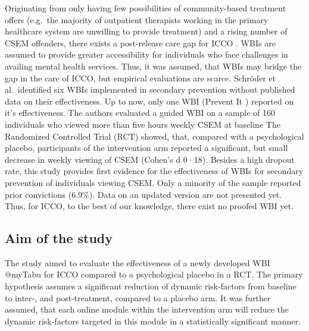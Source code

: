 \documentclass[
  super,
  preprint,
  1p,
  onecolumn]{elsarticle}
\begin{document}
Originating from only having few possibilities of community-based
treatment offers (e.g.~the majority of outpatient therapists working in
the primary healthcare system are unwilling to provide treatment) and a
rising number of CSEM offenders, there exists a post-release care gap
for ICCO .
\citep{schmidtOutpatientTherapistsPerspectives2022, baskurtMetaanalysisRecidivismRates2024}
WBIs are assumed to provide greater accessibility for individuals who
face challenges in availing mental health services.
\citep{crocamoDigitalHealthInterventions2025} Thus, it was assumed, that
WBIs may bridge the gap in the care of ICCO, but empirical evaluations
are scarce.
\citep{wildWebBasedHealthServices2019, hillertWebBasedInitiativesPrevent2024, schroderWebBasedInterventionsIndividuals2023}
Schröder et al.~identified six WBIs implemented in secondary prevention
without published data on their effectiveness.
\citep{schroderWebBasedInterventionsIndividuals2023} Up to now, only one
WBI (Prevent It \citep{latthEffectsInternetdeliveredCognitive2022})
reported on it's effectiveness. The authors evaluated a guided WBI on a
sample of 160 individuals who viewed more than five hours weekly CSEM at
baseline \citep{latthChildSexualAbuse2025} The Randomized Controlled
Trial (RCT) showed, that, compared with a psychological placebo,
participants of the intervention arm reported a significant, but small
decrease in weekly viewing of CSEM (Cohen's d 0·18). Besides a high
dropout rate, this study provides first evidence for the effectiveness
of WBIs for secondary prevention of individuals viewing CSEM. Only a
minority of the sample reported prior convictions (6.9\%).
\citep{hillertWebBasedInitiativesPrevent2024, setoEvaluatingChildSexual2024}
Data on an updated version are not presented yet.
\citep{haubrockCriminalPolicePerceptions} Thus, for ICCO, to the best of
our knowledge, there exist no proofed WBI yet.

\subsection{Aim of the study}\label{aim-of-the-study}

The study aimed to evaluate the effectiveness of a newly developed WBI
@myTabu for ICCO compared to a psychological placebo in a RCT. The
primary hypothesis assumes a significant reduction of dynamic
risk-factors from baseline to inter-, and post-treatment, compared to a
placebo arm. It was further assumed, that each online module within the
intervention arm will reduce the dynamic risk-factors targeted in this
module in a statistically significant manner.
\end{document}
